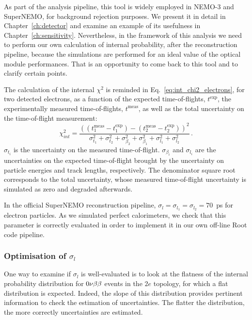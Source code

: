 As part of the analysis pipeline, this tool is widely employed in NEMO-$3$ and SuperNEMO, for background rejection purposes.
We present it in detail in Chapter~\ref{ch:detector} and examine an example of its usefulness in Chapter~\ref{ch:sensitivity}.
Nevertheless, in the framework of this analysis we need to perform our own calculation of internal probability, after the reconstruction pipeline, because the simulations are performed for an ideal value of the optical module performances.
That is an opportunity to come back to this tool and to clarify certain points.

The calculation of the internal $\chi^{2}$ is reminded in Eq.~\eqref{eq:int_chi2_electrons}, for two detected electrons, as a function of the expected time-of-flights, $t^{\text{exp}}$, the experimentally measured time-of-flights, $t^{\text{meas}}$, as well as the total uncertainty on the time-of-flight measurement:
\begin{equation}
  \chi^{2}_{int}=\frac{((t^{\text{meas}}_{1} - t^{\text{exp}}_{1}) - (t^{\text{meas}}_{2} - t^{\text{exp}}_{2}))^{2}}{\sigma_{t_{1}}^{2}+\sigma_{t_{2}}^{2}+\sigma_{\beta_{2}}^{2}+\sigma_{\beta_{1}}^{2}+\sigma_{l_{1}}^{2}+\sigma_{l_{2}}^{2}}\,.
  \label{eq:int_chi2_electrons}
\end{equation}
$\sigma_{t_{i}}$ is the uncertainty on the measured time-of-flight.
$\sigma_{\beta_{i}}$ and $\sigma_{l_{i}}$ are the uncertainties on the expected time-of-flight brought by the uncertainty on particle energies and track lengths, respectively.
The denominator square root corresponds to the total uncertainty, whose measured time-of-flight uncertainty is simulated as zero and degraded afterwards.

In the official SuperNEMO reconstruction pipeline, ${\sigma_{l}=\sigma_{l_{1}}=\sigma_{l_{2}}=70}$~ps for electron particles.
As we simulated perfect calorimeters, we check that this parameter is correctly evaluated in order to implement it in our own off-line Root code pipeline.

\subsubsection*{Optimisation of $\sigma_{l}$}

One way to examine if $\sigma_{l}$ is well-evaluated is to look at the flatness of the internal probability distribution for $0\nu\beta\beta$ events in the $2e$ topology, for which a flat distribution is expected.
Indeed, the slope of this distribution provides pertinent information to check the estimation of uncertainties.
The flatter the distribution, the more correctly uncertainties are estimated.

